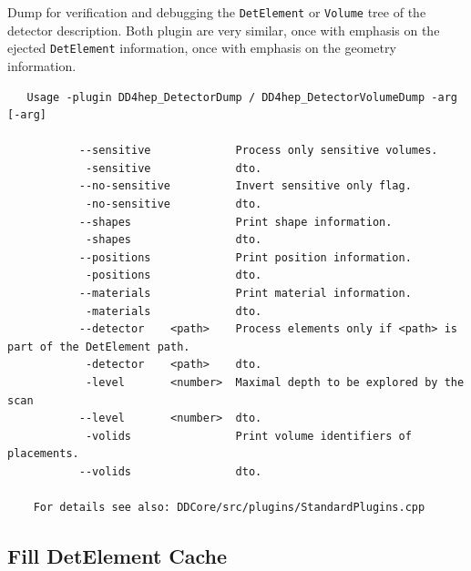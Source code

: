 Dump for verification and debugging the \texttt{DetElement} or \texttt{Volume} tree
of the detector description. Both plugin are very similar, once with emphasis on the
ejected \texttt{DetElement} information, once with emphasis on the geometry information.
\begin{verbatim}
   Usage -plugin DD4hep_DetectorDump / DD4hep_DetectorVolumeDump -arg [-arg]

	       --sensitive             Process only sensitive volumes.                                
	        -sensitive             dto.                                                           
	       --no-sensitive          Invert sensitive only flag.                                    
	        -no-sensitive          dto.                                                           
	       --shapes                Print shape information.                                       
	        -shapes                dto.                                                           
	       --positions             Print position information.                                    
	        -positions             dto.                                                           
	       --materials             Print material information.                                    
	        -materials             dto.                                                           
	       --detector    <path>    Process elements only if <path> is part of the DetElement path.
	        -detector    <path>    dto.                                                           
	        -level       <number>  Maximal depth to be explored by the scan                       
	       --level       <number>  dto.                                                           
	        -volids                Print volume identifiers of placements.                        
	       --volids                dto.                                                           

    For details see also: DDCore/src/plugins/StandardPlugins.cpp
\end{verbatim}

\subsection{Fill DetElement Cache}
\label{sec:dd4hep-manual-plugin-chache-detelement-info}

